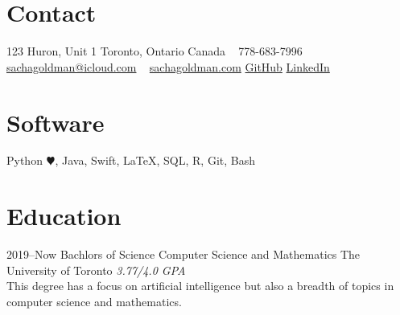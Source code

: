 \documentclass[]{style}
\begin{document}


\begin{aside} %
\section{Contact}
123 Huron, Unit 1
Toronto, Ontario
Canada
~
778-683-7996
\href{mailto:sachagoldman@icloud.com}{sachagoldman@icloud.com}
~
\href{https://sachagoldman.com}{sachagoldman.com}
\href{https://github.com/SachaGoldman}{GitHub}
\href{https://linkedin.com/in/sacha-goldman-5b95391a0/}{LinkedIn}
\section{Software}
Python {\color{red} $\varheartsuit$}, Java,
Swift, \LaTeX, SQL, 
R, Git, Bash
\end{aside}


\section{Education}

\begin{entrylist}


\entry
{2019--Now}
{Bachlors of Science {\normalfont Computer Science and Mathematics}}
{The University of Toronto}
{\emph{3.77/4.0 GPA} \\ This degree has a focus on artificial intelligence but also a breadth of topics in computer science and mathematics.}


\end{entrylist}

\end{document}
